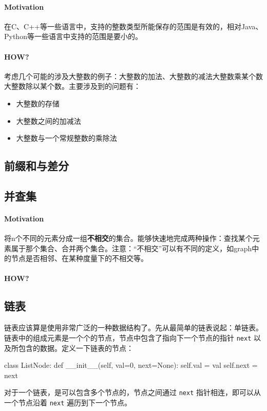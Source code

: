 \paragraph{Motivation}在C、C++等一些语言中，支持的整数类型所能保存的范围是有效的，相对Java、Python等一些语言中支持的范围是要小的。

\paragraph{HOW?}考虑几个可能的涉及大整数的例子：大整数的加法、大整数的减法大整数乘某个数大整数除以某个数。主要涉及到的问题有：
\begin{itemize}
	\item 大整数的存储
	\item 大整数之间的加减法
	\item 大整数与一个常规整数的乘除法
\end{itemize}


\subsection{前缀和与差分}


\subsection{并查集}
\paragraph{Motivation}将n个不同的元素分成一组\textbf{不相交}的集合。能够快速地完成两种操作：查找某个元素属于那个集合、合并两个集合。注意：“不相交”可以有不同的定义，如graph中的节点是否相邻、在某种度量下的不相交等。

\paragraph{HOW?}

\subsection{链表}
链表应该算是使用非常广泛的一种数据结构了。先从最简单的链表说起：单链表。链表中的组成元素是一个个的节点，节点中包含了指向下一个节点的指针 \texttt{next} 以及所包含的数据。定义一下链表的节点：
\begin{python}
	class ListNode:
	     def __init__(self, val=0, next=None):
	         self.val = val
	         self.next = next
\end{python}
对于一个链表，是可以包含多个节点的，节点之间通过 \texttt{next} 指针相连，即可以从一个节点沿着 \texttt{next} 遍历到下一个节点。